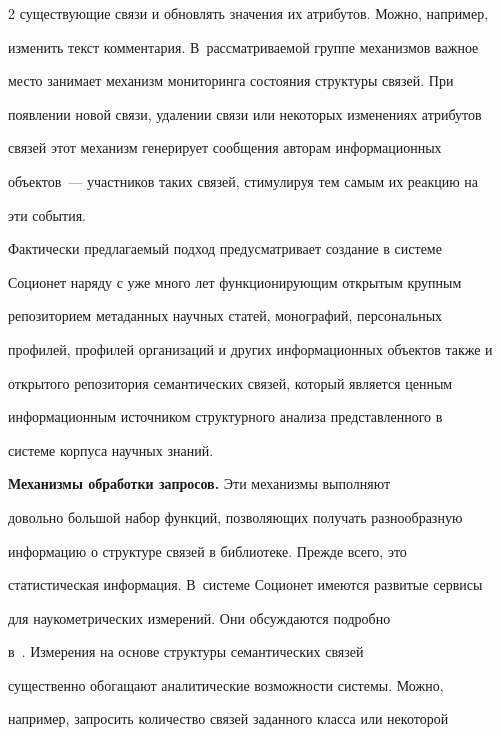 \begin{multicols}{2}
существующие связи и обновлять значения их атрибутов. Можно, например, 


изменить текст комментария. В~рассматриваемой группе механизмов важное 


место занимает механизм мониторинга состояния структуры связей. При 


появлении новой связи, удалении связи или некоторых изменениях атрибутов 


связей этот механизм генерирует сообщения авторам информационных 


объектов~--- участников таких связей, стимулируя тем самым их реакцию на 


эти события. 


  


  Фактически предлагаемый подход предусматривает создание в сис\-те\-ме 


Соционет наряду с уже много лет функционирующим открытым крупным 


репозиторием метаданных научных статей, монографий, персональных 


профилей, профилей организаций и других информационных объектов также и 


открытого репозитория семантических связей, который является ценным 


информационным источником структурного анализа представленного в 


системе корпуса научных знаний. 


  


  \smallskip


  


  \textbf{Механизмы обработки запросов.} Эти механизмы выполняют 


довольно большой набор функций, позволяющих получать разнообразную 


информацию о структуре связей в библиотеке. Прежде всего, это 


статистическая информация. В~системе Соционет имеются развитые сервисы 


для нау\-ко\-мет\-ри\-че\-ских измерений. Они обсуждаются подробно 


  в~\cite{8-kog, 27-kog}. Измерения на основе структуры семантических связей 


существенно обогащают аналитические возможности системы. Можно, 


например, запросить количество связей заданного класса или некоторой 



\end{multicols}

